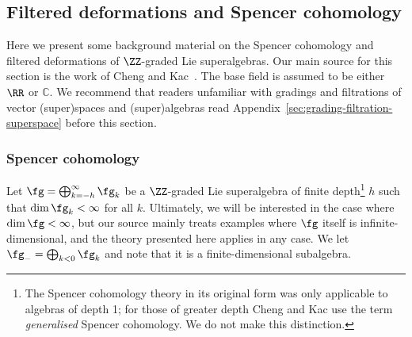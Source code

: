 \subsection{Filtered deformations and Spencer cohomology}
\label{sec:spencer-thy}

Here we present some background material on the Spencer cohomology and filtered deformations of $\ZZ$-graded Lie superalgebras. Our main source for this section is the work of Cheng and Kac~\cite{Cheng1998}. The base field is assumed to be either $\RR$ or $\mathbb{C}$. We recommend that readers unfamiliar with gradings and filtrations of vector (super)spaces and (super)algebras read Appendix~\ref{sec:grading-filtration-superspace} before this section.

\subsubsection{Spencer cohomology}
\label{subsec:spencer-cohomology}

Let $\fg=\bigoplus_{k=-h}^\infty\fg_k$ be a $\ZZ$-graded Lie superalgebra of finite depth\footnote{The Spencer cohomology theory in its original form was only applicable to algebras of depth 1; for those of greater depth Cheng and Kac use the term \emph{generalised} Spencer cohomology. We do not make this distinction.}
$h$ such that $\dim\fg_k<\infty$ for all $k$. Ultimately, we will be interested in the case where $\dim\fg<\infty$, but our source \cite{Cheng1998} mainly treats examples where $\fg$ itself is infinite-dimensional, and the theory presented here applies in any case. We let $\fg_-=\bigoplus_{k<0}\fg_k$ and note that it is a finite-dimensional subalgebra.



